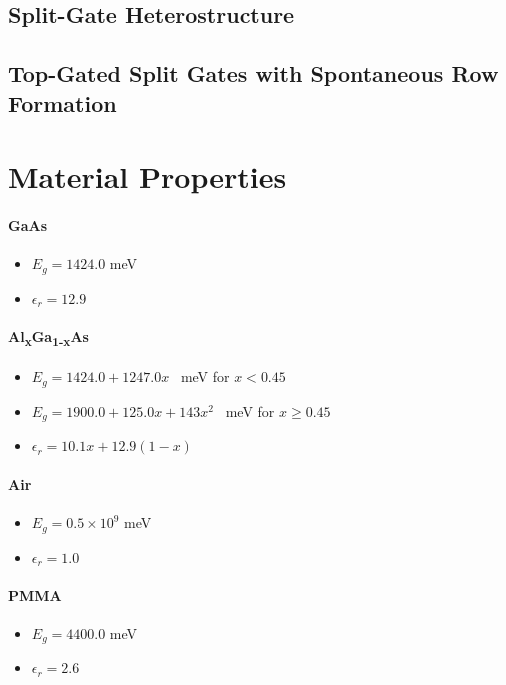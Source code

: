 \documentclass[12pt]{article}
\begin{document}
{\subsection{Split-Gate Heterostructure}

\subsection{Top-Gated Split Gates with Spontaneous Row Formation}
\label{subsec:TopAndSplitGate}
}


\appendix

\section{Material Properties}
\label{app:MaterialProperties}

\paragraph{GaAs}
\begin{itemize}
    \item{$E_g = 1424.0$ meV}
    \item{$\epsilon_r = 12.9$}
\end{itemize}

\paragraph{Al\textsubscript{x}Ga\textsubscript{1-x}As}
\begin{itemize}
    \item{$E_g = 1424.0 + 1247.0 x$ \ meV for $x < 0.45$}
    \item{$E_g = 1900.0 + 125.0 x + 143 x^2$ \ meV for $x \geq 0.45$}
    \item{$\epsilon_r = 10.1 x + 12.9 (1-x)$}
\end{itemize}

\paragraph{Air}
\begin{itemize}
    \item{$E_g = 0.5\times10^9$ meV}
    \item{$\epsilon_r = 1.0$}
\end{itemize}

\paragraph{PMMA}
\begin{itemize}
    \item{$E_g = 4400.0$ meV}
    \item{$\epsilon_r = 2.6$}
\end{itemize}
\end{document}
